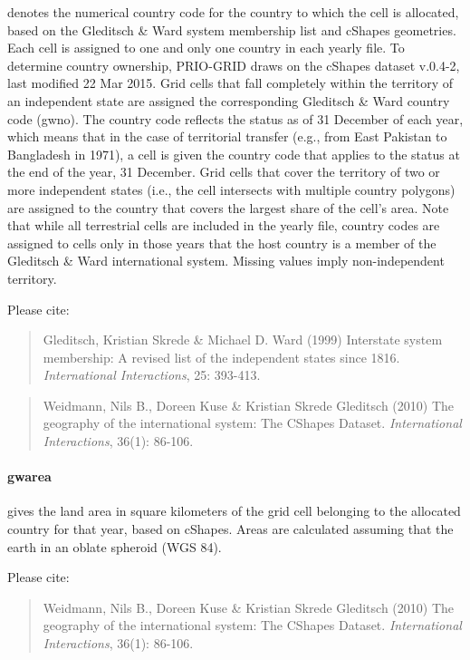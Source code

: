 \documentclass[]{book}
\begin{document}
denotes the numerical country code for the country to which the cell is
allocated, based on the Gleditsch \& Ward system membership list and
cShapes geometries. Each cell is assigned to one and only one country in
each yearly file. To determine country ownership, PRIO-GRID draws on the
cShapes dataset v.0.4-2, last modified 22 Mar 2015. Grid cells that fall
completely within the territory of an independent state are assigned the
corresponding Gleditsch \& Ward country code (gwno). The country code
reflects the status as of 31 December of each year, which means that in
the case of territorial transfer (e.g., from East Pakistan to Bangladesh
in 1971), a cell is given the country code that applies to the status at
the end of the year, 31 December. Grid cells that cover the territory of
two or more independent states (i.e., the cell intersects with multiple
country polygons) are assigned to the country that covers the largest
share of the cell's area. Note that while all terrestrial cells are
included in the yearly file, country codes are assigned to cells only in
those years that the host country is a member of the Gleditsch \& Ward
international system. Missing values imply non-independent territory.

Please cite:

\begin{quote}
Gleditsch, Kristian Skrede \& Michael D. Ward (1999) Interstate system
membership: A revised list of the independent states since 1816.
\emph{International Interactions}, 25: 393-413.
\end{quote}

\begin{quote}
Weidmann, Nils B., Doreen Kuse \& Kristian Skrede Gleditsch (2010) The
geography of the international system: The CShapes Dataset.
\emph{International Interactions}, 36(1): 86-106.
\end{quote}

\paragraph{gwarea}\label{gwarea}

gives the land area in square kilometers of the grid cell belonging to
the allocated country for that year, based on cShapes. Areas are
calculated assuming that the earth in an oblate spheroid (WGS 84).

Please cite:

\begin{quote}
Weidmann, Nils B., Doreen Kuse \& Kristian Skrede Gleditsch (2010) The
geography of the international system: The CShapes Dataset.
\emph{International Interactions}, 36(1): 86-106.
\end{quote}
\end{document}
